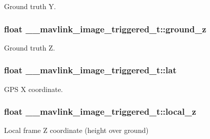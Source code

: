 Ground truth Y. 

\hypertarget{struct____mavlink__image__triggered__t_a19676d759a81600df8df9a77f68c2563}{
\subsubsection[{ground\+\_\+z}]{\setlength{\rightskip}{0pt plus 5cm}float \+\_\+\+\_\+mavlink\+\_\+image\+\_\+triggered\+\_\+t\+::ground\+\_\+z}}\label{struct____mavlink__image__triggered__t_a19676d759a81600df8df9a77f68c2563}


Ground truth Z. 

\hypertarget{struct____mavlink__image__triggered__t_a926411af0a73f2ca64ed8d2a330f30d1}{
\subsubsection[{lat}]{\setlength{\rightskip}{0pt plus 5cm}float \+\_\+\+\_\+mavlink\+\_\+image\+\_\+triggered\+\_\+t\+::lat}}\label{struct____mavlink__image__triggered__t_a926411af0a73f2ca64ed8d2a330f30d1}


G\+P\+S X coordinate. 

\hypertarget{struct____mavlink__image__triggered__t_a781ed148c148052c863ea2007174a181}{
\subsubsection[{local\+\_\+z}]{\setlength{\rightskip}{0pt plus 5cm}float \+\_\+\+\_\+mavlink\+\_\+image\+\_\+triggered\+\_\+t\+::local\+\_\+z}}\label{struct____mavlink__image__triggered__t_a781ed148c148052c863ea2007174a181}


Local frame Z coordinate (height over ground) 

